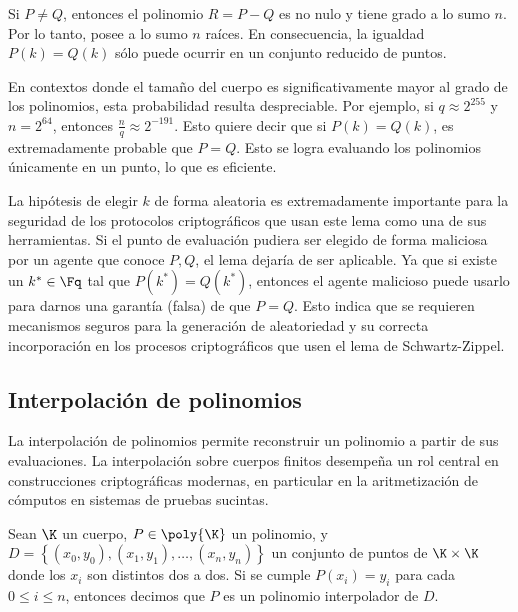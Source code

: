 Si $P \neq Q$, entonces el polinomio $R = P - Q$ es no nulo y tiene grado a lo sumo $n$. Por lo tanto, posee a lo sumo $n$ raíces. En consecuencia, la igualdad $P(k) = Q(k)$ sólo puede ocurrir en un conjunto reducido de puntos.

En contextos donde el tamaño del cuerpo es significativamente mayor al grado de los polinomios, esta probabilidad resulta despreciable. Por ejemplo, si $q \approx 2^{255}$ y $n = 2^{64}$, entonces $\frac{n}{q} \approx 2^{-191}$. Esto quiere decir que si $P(k) = Q(k)$, es extremadamente probable que $P = Q$. Esto se logra evaluando los polinomios únicamente en un punto, lo que es eficiente.

La hipótesis de elegir $k$ de forma aleatoria es extremadamente importante para la seguridad de los protocolos criptográficos que usan este lema como una de sus herramientas. Si el punto de evaluación pudiera ser elegido de forma maliciosa por un agente que conoce $P, Q$, el lema dejaría de ser aplicable. Ya que si existe un $k^* \in \Fq$ tal que $P(k^*) = Q(k^*)$, entonces el agente malicioso puede usarlo para darnos una garantía (falsa) de que $P = Q$. Esto indica que se requieren mecanismos seguros para la generación de aleatoriedad y su correcta incorporación en los procesos criptográficos que usen el lema de Schwartz-Zippel.

\subsection{Interpolación de polinomios}

La interpolación de polinomios permite reconstruir un polinomio a partir de sus evaluaciones. La interpolación sobre cuerpos finitos desempeña un rol central en construcciones criptográficas modernas, en particular en la aritmetización de cómputos en sistemas de pruebas sucintas.

\begin{definition}
	Sean $\K$ un cuerpo, $P \in \poly{\K}$ un polinomio, y $D = \left\{(x_0, y_0), (x_1, y_1), \ldots, (x_n, y_n)\right\}$ un conjunto de puntos de $\K \times \K$ donde los $x_i$ son distintos dos a dos. Si se cumple $P(x_i) = y_i$ para cada $0 \leq i \leq n$, entonces decimos que $P$ es un polinomio interpolador de $D$.
\end{definition}

